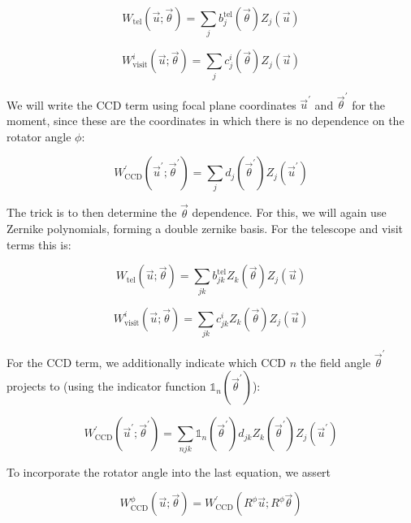 \documentclass{article}
\begin{document}
\begin{equation}
    W_\mathrm{tel}\left(\vec{u}; \vec{\theta}\right) =
    \sum_j b^\mathrm{tel}_j (\vec{\theta}) Z_j(\vec{u})
\end{equation}

\begin{equation}
    W^i_\mathrm{visit}\left(\vec{u}; \vec{\theta}\right) =
    \sum_j c^i_j (\vec{\theta}) Z_j(\vec{u})
\end{equation}

We will write the CCD term using focal plane coordinates $\vec{u}^\prime$ and
$\vec{\theta}^\prime$ for the moment, since these are the coordinates in which
there is no dependence on the rotator angle $\phi$:

\begin{equation}
    W^\prime_\mathrm{CCD}\left(\vec{u}^\prime; \vec{\theta}^\prime\right) =
    \sum_j d_j (\vec{\theta}^\prime) Z_j(\vec{u}^\prime)
\end{equation}

The trick is to then determine the $\vec{\theta}$ dependence.  For this, we will
again use Zernike polynomials, forming a double zernike basis.  For the
telescope and visit terms this is:

\begin{equation}
    W_\mathrm{tel}\left(\vec{u}; \vec{\theta}\right) =
    \sum_{jk} b^\mathrm{tel}_{jk} Z_k(\vec{\theta}) Z_j(\vec{u})
\end{equation}

\begin{equation}
    W^i_\mathrm{visit}\left(\vec{u}; \vec{\theta}\right) =
    \sum_{jk} c^i_{jk} Z_k(\vec{\theta}) Z_j(\vec{u})
\end{equation}

For the CCD term, we additionally indicate which CCD $n$ the field angle
$\vec{\theta}^\prime$ projects to (using the indicator function
$\mathbb{1}_n(\vec{\theta}^\prime)$):

\begin{equation}
    W^\prime_\mathrm{CCD}\left(\vec{u}^\prime; \vec{\theta}^\prime\right) =
    \sum_{njk} \mathbb{1}_n(\vec{\theta}^\prime) d_{jk} Z_k(\vec{\theta}^\prime) Z_j(\vec{u}^\prime)
\end{equation}

To incorporate the rotator angle into the last equation, we assert

\begin{equation}
    W^\phi_\mathrm{CCD}\left(\vec{u}; \vec{\theta}\right) =
    W^\prime_\mathrm{CCD}\left(R^\phi\vec{u}; R^\phi\vec{\theta}\right)
\end{equation}
\end{document}

